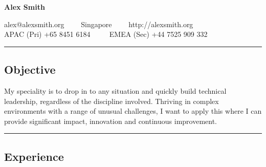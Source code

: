 \documentclass[10pt,a4paper]{article}
\begin{document}
\begin{center}
{\LARGE \textbf{Alex Smith}}


alex@alexsmith.org\ \ \textbullet
\ \ Singapore\ \ \textbullet
\ \ http://alexsmith.org
\\
APAC (Pri) +65 8451 6184 \ \ \textbullet
\ \ EMEA (Sec) +44 7525 909 332
\end{center}

\hrule
\vspace{-0.4em}
\subsection*{Objective}
    My speciality is to drop in to any situation and quickly build technical leadership, regardless of the discipline involved. Thriving in complex environments with a range of unusual challenges, I want to apply this where I can provide significant impact, innovation and continuous improvement.
    \\

\hrule
\vspace{-0.4em}
\subsection*{Experience}
\end{document}
